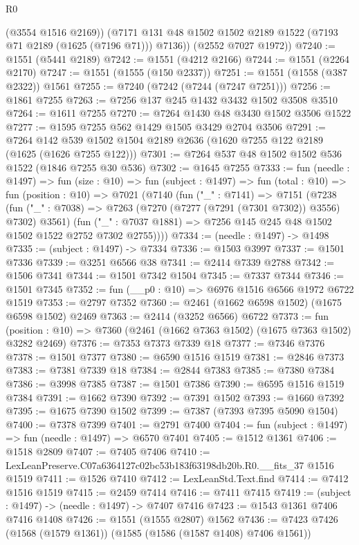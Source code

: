 \begin{lexlean}{R0}
\begin{coremodule}
          (@3554 @1516 @2169))
        (@7171 @131 @48 @1502 @1502 @2189 @1522 (@7193 @71 @2189 (@1625 (@7196 @71))) @7136))
      (@2552 @7027 @1972))
@7240 := @1551 (@5441 @2189)
@7242 := @1551 (@4212 @2166)
@7244 := @1551 (@2264 @2170)
@7247 := @1551 (@1555 (@150 @2337))
@7251 := @1551 (@1558 (@387 @2322)) @1561
@7255 := @7240 (@7242 (@7244 (@7247 @7251)))
@7256 := @1861 @7255
@7263 := @7256 @137 @245 @1432 @3432 @1502 @3508 @3510
@7264 := @1611 @7255
@7270 := @7264 @1430 @48 @3430 @1502 @3506 @1522
@7277 := @1595 @7255 @562 @1429 @1505 @3429 @2704 @3506
@7291 := @7264 @142 @539 @1502 @1504 @2189 @2636 (@1620 @7255 @122 @2189 (@1625 (@1626 @7255 @122)))
@7301 := @7264 @537 @48 @1502 @1502 @536 @1522 (@1846 @7255 @30 @536)
@7302 := @1645 @7255
@7333 := fun (needle : @1497) =>
  fun (size : @10) =>
  fun (subject : @1497) =>
  fun (total : @10) =>
  fun (position : @10) =>
  @7021
    (@7140
      (fun ("_" : @7141) =>
      @7151
        (@7238
          (fun ("_" : @7038) => @7263 (@7270 (@7277 (@7291 (@7301 @7302)) @3556) @7302) @3561)
          (fun ("_" : @7037 @1881) => @7256 @145 @245 @48 @1502 @1502 @1522 @2752 @7302 @2755))))
@7334 := (needle : @1497) -> @1498
@7335 := (subject : @1497) -> @7334
@7336 := @1503 @3997
@7337 := @1501 @7336
@7339 := @3251 @6566 @38
@7341 := @2414 @7339 @2788
@7342 := @1506 @7341
@7344 := @1501 @7342 @1504
@7345 := @7337 @7344
@7346 := @1501 @7345
@7352 := fun (__p0 : @10) => @6976 @1516 @6566 @1972 @6722 @1519
@7353 := @2797 @7352
@7360 := @2461 (@1662 @6598 @1502) (@1675 @6598 @1502) @2469
@7363 := @2414 (@3252 @6566) @6722
@7373 := fun (position : @10) => @7360 (@2461 (@1662 @7363 @1502) (@1675 @7363 @1502) @3282 @2469)
@7376 := @7353 @7373 @7339 @18
@7377 := @7346 @7376
@7378 := @1501 @7377
@7380 := @6590 @1516 @1519
@7381 := @2846 @7373
@7383 := @7381 @7339 @18
@7384 := @2844 @7383
@7385 := @7380 @7384
@7386 := @3998 @7385
@7387 := @1501 @7386
@7390 := @6595 @1516 @1519 @7384
@7391 := @1662 @7390
@7392 := @7391 @1502
@7393 := @1660 @7392
@7395 := @1675 @7390 @1502
@7399 := @7387 (@7393 @7395 @5090 @1504)
@7400 := @7378 @7399
@7401 := @2791 @7400
@7404 := fun (subject : @1497) => fun (needle : @1497) => @6570 @7401
@7405 := @1512 @1361
@7406 := @1518 @2809
@7407 := @7405 @7406
@7410 := LexLeanPreserve.C07a6364127c02bc53b183f63198db20b.R0.__fits_37 @1516 @1519
@7411 := @1526 @7410
@7412 := LexLeanStd.Text.find
@7414 := @7412 @1516 @1519
@7415 := @2459 @7414
@7416 := @7411 @7415
@7419 := (subject : @1497) -> (needle : @1497) -> @7407 @7416
@7423 := @1543 @1361 @7406 @7416 @1408
@7426 := @1551 (@1555 @2807) @1562
@7436 := @7423 @7426 (@1568 (@1579 @1361)) (@1585 (@1586 (@1587 @1408) @7406 @1561))

\end{coremodule}
\end{lexlean}
